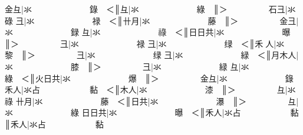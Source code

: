 {\cjk{}{\cnsym{}　　　　}金彑}|{\cjk{}氺{\cnsym{}　　　　　　　}錄{\cnsym{}　}＜}║{\cjk{}{\cnsym{}　　　　　}彑}|{\cjk{}氺{\cnsym{}　　　　　　　}綠{\cnsym{}　}}║{\cjk{}＞{\cnsym{}　　　　　}石彐}|{\cjk{}氺{\cnsym{}　　　　　　　}碌} 
{\cjk{}{\cnsym{}　　　　}彐}|{\cjk{}氺{\cnsym{}　　　　　　　}禄{\cnsym{}　}＜}║{\cjk{}{\cnsym{}　　　　}卄月}|{\cjk{}氺{\cnsym{}　　　　　　　}藤{\cnsym{}　}}║{\cjk{}＞{\cnsym{}　　　　　}金彐}|{\cjk{}氺{\cnsym{}　　　　　　　}録} 
{\cjk{}{\cnsym{}　　　　}彑}|{\cjk{}氺{\cnsym{}　　　　　　　}祿{\cnsym{}　}＜}║{\cjk{}{\cnsym{}　　　　}日日共}|{\cjk{}氺{\cnsym{}　　　　　　　}曝{\cnsym{}　}}║{\cjk{}＞{\cnsym{}　　　　　}彐}|{\cjk{}氺{\cnsym{}　　　　　　　}禄} 
{\cjk{}{\cnsym{}　　　　}彐}|{\cjk{}氺{\cnsym{}　　　　　　　}绿{\cnsym{}　}＜}║{\cjk{}{\cnsym{}　　　　}禾{\cnjzr{}}人}|{\cjk{}氺{\cnsym{}　　　　　　　}黎{\cnsym{}　}}║{\cjk{}＞{\cnsym{}　　　　　}彐}|{\cjk{}氺{\cnsym{}　　　　　　　}绿} 
{\cjk{}{\cnsym{}　　　　}彐}|{\cjk{}氺{\cnsym{}　　　　　　　}緑{\cnsym{}　}＜}║{\cjk{}{\cnsym{}　　　　}月木人}|{\cjk{}氺{\cnsym{}　　　　　　　}膝{\cnsym{}　}}║{\cjk{}＞{\cnsym{}　　　　　}彐}|{\cjk{}氺{\cnsym{}　　　　　　　}緑} 
{\cjk{}{\cnsym{}　　　　}彑}|{\cjk{}氺{\cnsym{}　　　　　　　}綠{\cnsym{}　}＜}║{\cjk{}{\cnsym{}　　　　}火日共}|{\cjk{}氺{\cnsym{}　　　　　　　}爆{\cnsym{}　}}║{\cjk{}＞{\cnsym{}　　　　　}金彑}|{\cjk{}氺{\cnsym{}　　　　　　　}錄} 
{\cjk{}{\cnsym{}　　　　}禾人}|{\cjk{}氺占{\cnsym{}　　　　　　}黏{\cnsym{}　}＜}║{\cjk{}{\cnsym{}　　　　}木人}|{\cjk{}氺{\cnsym{}　　　　　　　}漆{\cnsym{}　}}║{\cjk{}＞{\cnsym{}　　　　　}彑}|{\cjk{}氺{\cnsym{}　　　　　　　}祿} 
{\cjk{}{\cnsym{}　　　}卄月}|{\cjk{}氺{\cnsym{}　　　　　　　}藤{\cnsym{}　}＜}║{\cjk{}{\cnsym{}　　　　}日共}|{\cjk{}氺{\cnsym{}　　　　　　　}瀑{\cnsym{}　}}║{\cjk{}＞{\cnsym{}　　　　　}彑}|{\cjk{}氺{\cnsym{}　　　　　　　}綠} 
{\cjk{}{\cnsym{}　　　}日日共}|{\cjk{}氺{\cnsym{}　　　　　　　}曝{\cnsym{}　}＜}║{\cjk{}{\cnsym{}　　　　　}禾人}|{\cjk{}氺占{\cnsym{}　　　　　　}黏{\cnsym{}　}}║{\cjk{}{\cnsym{}　　　　　　}禾人}|{\cjk{}氺占{\cnsym{}　　　　　　}黏} 
